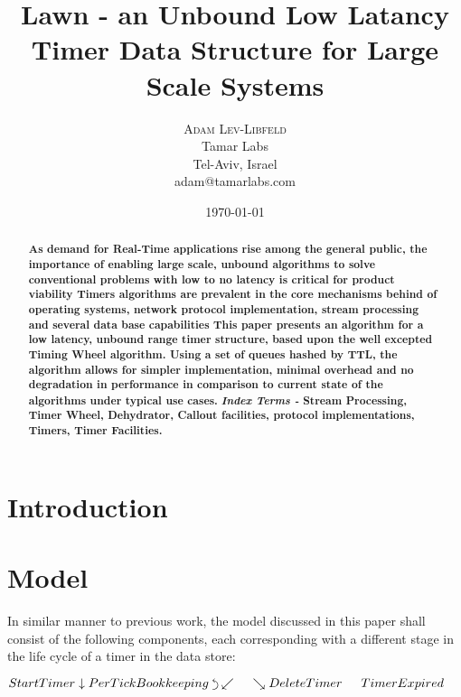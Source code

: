 \documentclass[twocolumn,a4paper]{article}
\title{Lawn - an Unbound Low Latancy Timer Data Structure for Large Scale Systems}
\author{
	\textsc{Adam Lev-Libfeld} \\[1ex]
	\normalsize Tamar Labs \\
	\normalsize Tel-Aviv, Israel \\
	\normalsize{adam@tamarlabs.com}
}
\date{\today}
\newcommand{\backtrackarrow}{\rotatebox[origin=c]{-90}{$\curvearrowleft$}}
\begin{document}
\maketitle

\begin{abstract}
\textbf{\noindent As demand for Real-Time applications rise among 
the general public, the importance of enabling large scale, unbound algorithms to solve conventional problems with low to no latency is critical for product viability Timers algorithms are prevalent in the core mechanisms behind of operating systems, network protocol implementation, stream processing and several data base capabilities This paper presents an algorithm for a low latency, unbound range timer structure, based upon the well excepted Timing Wheel algorithm. Using a set of queues hashed by TTL, the algorithm allows for simpler implementation, minimal overhead and no degradation in performance in comparison to current state of the algorithms under typical use cases.}
\linebreak \linebreak
\textbf{\textit{Index Terms -} Stream Processing, Timer Wheel, Dehydrator, Callout facilities, protocol implementations, Timers, Timer Facilities.}
\end{abstract}


\section{Introduction}

\section{Model}
In similar manner to previous work\cite{TW}, the model discussed in this paper shall consist of the following components, each corresponding with a different stage in the life cycle of a timer in the data store:
\begin{center}
	$
	StartTimer \linebreak 
	\downarrow \linebreak  
	PerTickBookkeeping \hspace{1mm} \backtrackarrow \linebreak 
	\swarrow  \hspace{15pt}  \searrow \linebreak 
	DeleteTimer \hspace{15pt} TimerExpired
	$
	\vspace{3pt}
\end{center}
\end{document}
